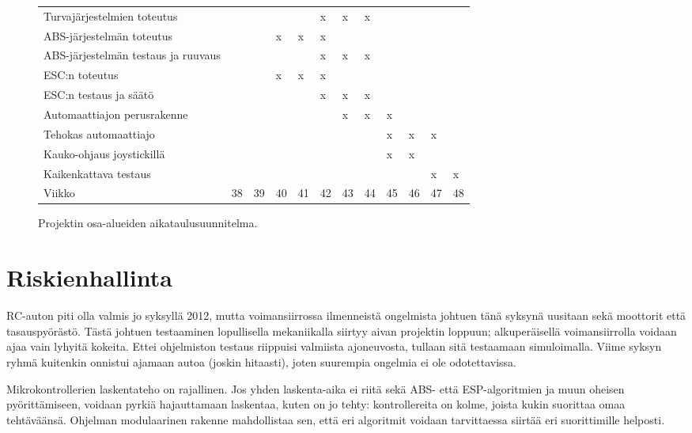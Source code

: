 \documentclass{article}
\begin{document}
\begin{figure}[H]
\begin{tabular}{l|l|l|l|l|l|l|l|l|l|l|l|}
		Turvajärjestelmien toteutus 
		&   &   &   &   & x & x & x &   &   &   &   \\
		ABS-järjestelmän toteutus
		&   &   & x & x & x &   &   &   &   &   &   \\
		ABS-järjestelmän testaus ja ruuvaus
		&   &   &   &   & x & x & x &   &   &   &   \\
		ESC:n toteutus
		&   &   & x & x & x &   &   &   &   &   &   \\
		ESC:n testaus ja säätö
		&   &   &   &   & x & x & x &   &   &   &   \\
		Automaattiajon perusrakenne
		&   &   &   &   &   & x & x & x &   &   &   \\
		Tehokas automaattiajo
		&   &   &   &   &   &   &   & x & x & x &   \\
		Kauko-ohjaus joystickillä
		&   &   &   &   &   &   &   & x & x &   &   \\
		Kaikenkattava testaus
		&   &   &   &   &   &   &   &   &   & x & x  \\

		\hline
		Viikko & 38 & 39 & 40 & 41 & 42 & 43 & 44 & 45 & 46 & 47 & 48
	\end{tabular}
	\label{fig:aikataulu}
	\caption{Projektin osa-alueiden aikataulusuunnitelma.}
\end{figure}

\section{Riskienhallinta}

RC-auton piti olla valmis jo syksyllä 2012, mutta voimansiirrossa ilmenneistä ongelmista johtuen tänä syksynä uusitaan sekä moottorit että tasauspyörästö. Tästä johtuen testaaminen lopullisella mekaniikalla siirtyy aivan projektin loppuun; alkuperäisellä voimansiirrolla voidaan ajaa vain lyhyitä kokeita. Ettei ohjelmiston testaus riippuisi valmiista ajoneuvosta, tullaan sitä testaamaan simuloimalla. Viime syksyn ryhmä kuitenkin onnistui ajamaan autoa (joskin hitaasti), joten suurempia ongelmia ei ole odotettavissa.

Mikrokontrollerien laskentateho on rajallinen. Jos yhden laskenta-aika ei riitä sekä ABS- että ESP-algoritmien ja muun oheisen pyörittämiseen, voidaan pyrkiä hajauttamaan laskentaa, kuten on jo tehty: kontrollereita on kolme, joista kukin suorittaa omaa tehtäväänsä. Ohjelman modulaarinen rakenne mahdollistaa sen, että eri algoritmit voidaan tarvittaessa siirtää eri suorittimille helposti.
\end{document}
